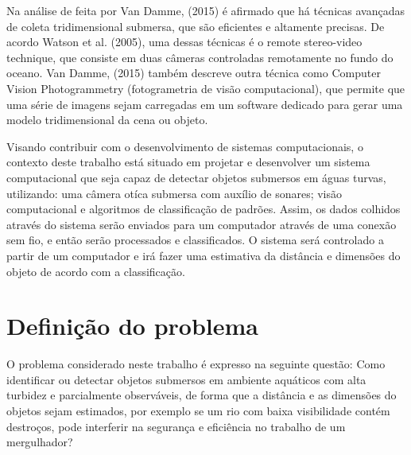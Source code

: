 Na análise de feita por Van Damme, (2015) é afirmado que há técnicas avançadas de coleta tridimensional submersa, que são eficientes e altamente precisas. De acordo Watson et al. (2005), uma dessas técnicas é o remote stereo-video technique, que consiste em duas câmeras controladas remotamente no fundo do oceano. Van Damme, (2015) também descreve outra técnica como Computer Vision Photogrammetry (fotogrametria de visão computacional), que permite que uma série de imagens sejam carregadas em um software dedicado para gerar uma modelo tridimensional da cena ou objeto.


Visando contribuir com o desenvolvimento de sistemas computacionais, o contexto deste trabalho está situado em projetar e desenvolver um sistema computacional que seja capaz de detectar objetos submersos em águas turvas, utilizando: uma câmera otíca submersa com auxílio de sonares; visão computacional e algoritmos de classificação de padrões. Assim, os dados colhidos através do sistema serão enviados para um computador através de uma conexão sem fio, e então serão processados e classificados. O sistema será controlado a partir de  um computador e  irá fazer uma estimativa da distância e dimensões do objeto de acordo com a classificação. 


\section{Definição do problema} 



O problema considerado neste trabalho é expresso na seguinte questão: Como identificar ou detectar objetos submersos em ambiente aquáticos com alta turbidez e parcialmente observáveis, de forma que a distância e as dimensões do objetos sejam estimados, por exemplo se um rio com baixa visibilidade contém destroços, pode interferir na segurança e eficiência no trabalho de um mergulhador?

